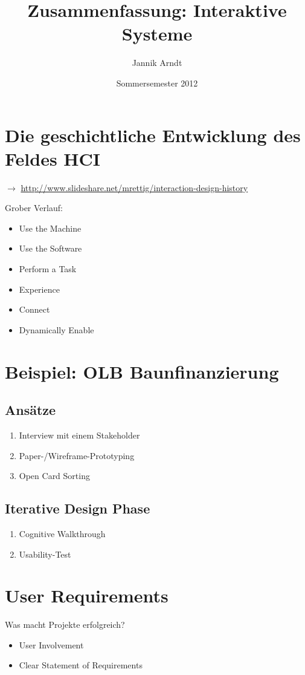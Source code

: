 \documentclass[a4paper,10pt]{article}
\begin{document}
	\title{Zusammenfassung: Interaktive Systeme}
	\author{Jannik Arndt}
	\date{Sommersemester 2012}
	\maketitle
	\tableofcontents

\pagebreak

\section{Die geschichtliche Entwicklung des Feldes HCI}
$\rightarrow$ \url{http://www.slideshare.net/mrettig/interaction-design-history}
\par
Grober Verlauf:
\begin{itemize}
	\item Use the Machine
	\item Use the Software
	\item Perform a Task
	\item Experience
	\item Connect
	\item Dynamically Enable
\end{itemize}

\section{Beispiel: OLB Baunfinanzierung}
\subsection{Ansätze}
\begin{enumerate}
	\item Interview mit einem Stakeholder
	\item Paper-/Wireframe-Prototyping
	\item Open Card Sorting
\end{enumerate}

\subsection{Iterative Design Phase}
\begin{enumerate}
	\item Cognitive Walkthrough
	\item Usability-Test
\end{enumerate}

\section{User Requirements}
Was macht Projekte erfolgreich?
\begin{itemize}
	\item User Involvement
	\item Clear Statement of Requirements
\end{itemize}
\end{document}
